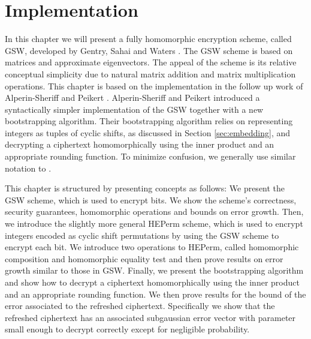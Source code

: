 \chapter{Implementation}\label{ch:implementation}

In this chapter we will present a fully homomorphic encryption scheme, called GSW, developed by Gentry, Sahai and Waters \cite{GSW13}. The GSW scheme is based on matrices and approximate eigenvectors. The appeal of the scheme is its relative conceptual simplicity due to natural matrix addition and matrix multiplication operations. This chapter is based on the implementation in the follow up work of Alperin-Sheriff and Peikert \cite{A-S-P-boot}. Alperin-Sheriff and Peikert introduced a syntactically simpler implementation of the GSW together with a new bootstrapping algorithm. Their bootstrapping algorithm relies on representing integers as tuples of cyclic shifts, as discussed in Section \ref{sec:embedding}, and decrypting a ciphertext homomorphically using the inner product and an appropriate rounding function. To minimize confusion, we generally use similar notation to \cite{A-S-P-boot}.

This chapter is structured by presenting concepts as follows: We present the GSW scheme, which is used to encrypt bits. We show the scheme's correctness, security guarantees, homomorphic operations and bounds on error growth. Then, we introduce the slightly more general HEPerm scheme, which is used to encrypt integers encoded as cyclic shift permutations by using the GSW scheme to encrypt each bit. We introduce two operations to HEPerm, called homomorphic composition and homomorphic equality test and then prove results on error growth similar to those in GSW. Finally, we present the bootstrapping algorithm and show how to decrypt a ciphertext homomorphically using the inner product and an appropriate rounding function. We then prove results for the bound of the error associated to the refreshed ciphertext. Specifically we show that the refreshed ciphertext has an associated subgaussian error vector with parameter small enough to decrypt correctly except for negligible probability.

